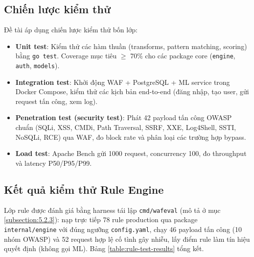 \documentclass[../DoAn.tex]{subfiles}
\begin{document}
\subsection{Chiến lược kiểm thử}
\label{subsection:4.6.1}

Đề tài áp dụng chiến lược kiểm thử bốn lớp:

\begin{itemize}[leftmargin=*]
    \item \textbf{Unit test}: Kiểm thử các hàm thuần (transforms, pattern
    matching, scoring) bằng \texttt{go test}. Coverage mục tiêu \(\ge\) 70\%
    cho các package core (\texttt{engine}, \texttt{auth}, \texttt{models}).

    \item \textbf{Integration test}: Khởi động WAF + PostgreSQL + ML
    service trong Docker Compose, kiểm thử các kịch bản end-to-end (đăng
    nhập, tạo user, gửi request tấn công, xem log).

    \item \textbf{Penetration test (security test)}: Phát 42 payload tấn
    công OWASP chuẩn (SQLi, XSS, CMDi, Path Traversal, SSRF, XXE, Log4Shell,
    SSTI, NoSQLi, RCE) qua WAF, đo block rate và phân loại các trường
    hợp bypass.

    \item \textbf{Load test}: Apache Bench gửi 1000 request, concurrency
    100, đo throughput và latency P50/P95/P99.
\end{itemize}

\subsection{Kết quả kiểm thử Rule Engine}
\label{subsection:4.6.2}

Lớp rule được đánh giá bằng harness tái lập \texttt{cmd/wafeval} (mô tả ở mục
\ref{subsection:5.2.3}): nạp trực tiếp 78 rule production qua package
\texttt{internal/engine} với đúng ngưỡng \texttt{config.yaml}, chạy 46 payload
tấn công (10 nhóm OWASP) và 52 request hợp lệ cố tình gây nhiễu, lấy điểm rule
làm tín hiệu quyết định (không gọi ML). Bảng \ref{table:rule-test-results} tổng
kết.
\end{document}
